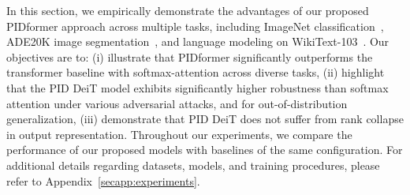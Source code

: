 In this section, we empirically demonstrate the advantages of our proposed PIDformer approach across multiple tasks, including ImageNet classification~\cite{deng2009imagenet}, ADE20K image segmentation~\cite{zhou2018semantic}, and language modeling on WikiText-103~\cite{DBLP:conf/iclr/MerityX0S17}. Our objectives are to: (i) illustrate that PIDformer significantly outperforms the transformer baseline with softmax-attention across diverse tasks, (ii) highlight that the PID DeiT model exhibits significantly higher robustness than softmax attention under various adversarial attacks, and for out-of-distribution generalization, (iii) demonstrate that PID DeiT does not suffer from rank collapse in output representation.
Throughout our experiments, we compare the performance of our proposed models with baselines of the same configuration. For additional details regarding datasets, models, and training procedures, please refer to Appendix~\ref{secapp:experiments}.


